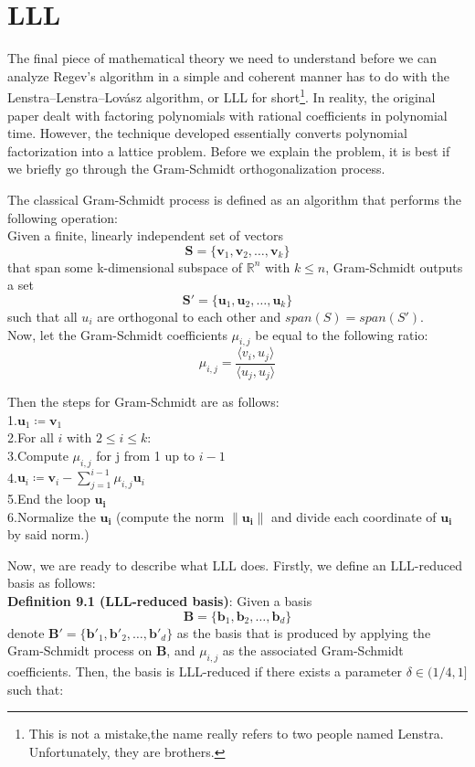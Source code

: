 \chapter{LLL}

The final piece of mathematical theory we need to understand before we can analyze Regev's algorithm in a simple and coherent manner has to do with the Lenstra–Lenstra–Lovász algorithm, or LLL for short\footnote{This is not a mistake,the name really refers to two people named Lenstra. Unfortunately, they are brothers.}. In reality, the original paper dealt with factoring polynomials with rational coefficients in polynomial time. However, the technique developed essentially converts polynomial factorization into a lattice problem. Before we explain the problem, it is best if we briefly go through the Gram-Schmidt orthogonalization process.

The classical Gram-Schmidt process is defined as an algorithm that performs the following operation:\\
Given a finite, linearly independent set of vectors $$\mathbf{S} = \{ \mathbf{v}_1, \mathbf{v}_2, \dots, \mathbf{v}_k \}$$
that span some k-dimensional subspace of $\mathbb{R}^n$ with $k\leq n$, Gram-Schmidt outputs a set 
$$\mathbf{S'} = \{ \mathbf{u}_1, \mathbf{u}_2, \dots, \mathbf{u}_k \}$$
such that all $u_i$ are orthogonal to each other and $span(S) = span(S')$.\\
Now, let the Gram-Schmidt coefficients $\mu_{i,j}$ be equal to the following ratio:
$$
\mu_{i,j} = \frac{\langle v_i, u_j \rangle}{\langle u_j, u_j \rangle}
$$

Then the steps for Gram-Schmidt are as follows:\\
1.$\mathbf{u}_1 \coloneqq \mathbf{v}_1$\\
2.For all $i$ with $2\leq i \leq k$:\\
3.Compute $\mu_{i,j}$ for j from 1 up to $i - 1$\\
4.$\mathbf{u}_i \coloneqq \mathbf{v}_i - \sum_{j = 1}^{i-1} \mu_{i,j} \mathbf{u}_i$\\
5.End the loop $\mathbf{u_i}$\\
6.Normalize the $\mathbf{u_i}$ (compute the norm $\lVert \mathbf{u_i} \rVert$ and divide each coordinate of $\mathbf{u_i}$ by said norm.)


Now, we are ready to describe what LLL does. Firstly, we define an LLL-reduced basis as follows:\\

\textbf{Definition 9.1 (LLL-reduced basis)}: Given a basis $$\mathbf{B} = \{ \mathbf{b}_1, \mathbf{b}_2, \dots, \mathbf{b}_d \}$$
denote $\mathbf{B}' = \{ \mathbf{b}'_1, \mathbf{b}'_2, \dots, \mathbf{b}'_d \}$ as the basis that is produced by applying the Gram-Schmidt process on $\mathbf{B}$, 
and $\mu_{i,j}$ as the associated Gram-Schmidt coefficients. Then, the basis is LLL-reduced if there exists a parameter $\delta \in (1/4,1]$ such that:\\

